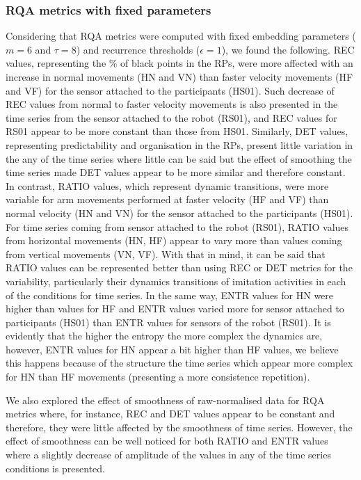 \subsubsection{RQA metrics with fixed parameters}
Considering that RQA metrics were computed with fixed embedding 
parameters ($m=6$ and $\tau=8$) and recurrence thresholds ($\epsilon=1$), 
we found the following. REC values, representing the \% of black points 
in the RPs, were more affected with an increase in normal  movements 
(HN and VN) than faster velocity movements (HF and VF) for the sensor attached 
to the participants (HS01). Such decrease of REC values from normal 
to faster velocity movements is also presented in the time series 
from the sensor attached to the robot (RS01), and REC values for RS01
appear to be more constant than those from HS01. 
Similarly, DET values, representing predictability and organisation in 
the RPs, present little variation in the any of the time series where 
little can be said but the effect of smoothing the time series made DET 
values appear to be more similar and therefore constant. 
In contrast, RATIO values, which represent dynamic 
transitions, were more variable for arm movements performed at faster
velocity (HF and VF) than normal velocity (HN and VN) 
for the sensor attached to the participants (HS01). 
For time series coming from sensor attached to the robot (RS01), 
RATIO values from horizontal movements (HN, HF) 
appear to vary more than values coming from vertical movements (VN, VF).
With that in mind, it can be said that RATIO values can be represented 
better than using REC or DET metrics for the variability, particularly their 
dynamics transitions of imitation activities in each of the conditions 
for time series.
In the same way, ENTR values for HN were higher than values for HF
and ENTR values varied more for sensor attached to participants (HS01) 
than ENTR values for sensors of the robot (RS01). It is evidently that 
the higher the entropy the more complex the dynamics are, 
however, ENTR values for HN appear a bit higher than HF values, 
we believe this happens because of the structure the time series
which appear more complex for HN than HF movements (presenting a 
more consistence repetition).

We also explored the effect of smoothness of 
raw-normalised data for RQA metrics where, for instance, REC and DET values 
appear to be constant and therefore, they were little affected by 
the smoothness of time series. 
However, the effect of smoothness can be well noticed for both
RATIO and ENTR values where a slightly decrease of amplitude of the values
in any of the time series conditions is presented.


